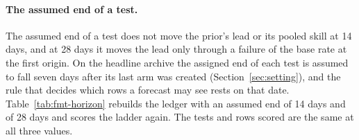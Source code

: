 \paragraph{The assumed end of a test.}
The assumed end of a test does not move the prior's lead or its pooled skill at 14 days, and at 28 days it moves the lead only through a failure of the base rate at the first origin. On the headline archive the assigned end of each test is assumed to fall seven days after its last arm was created (Section~\ref{sec:setting}), and the rule that decides which rows a forecast may see rests on that date. Table~\ref{tab:fmt-horizon} rebuilds the ledger with an assumed end of 14 days and of 28 days and scores the ladder again. The tests and rows scored are the same at all three values.
